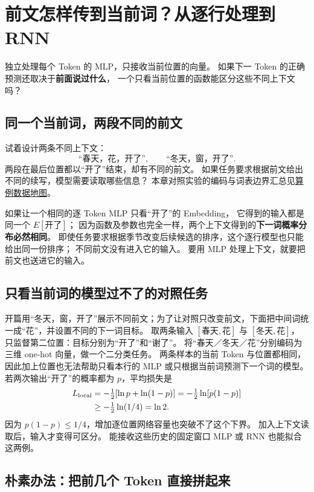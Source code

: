 \chapterrule
\section{前文怎样传到当前词？从逐行处理到 RNN}
\label{intro:context-gap}
\label{intro:context-and-rnn}

独立处理每个 Token 的 MLP，只接收当前位置的向量。
如果下一 Token 的正确预测还取决于\textbf{前面说过什么}，
一个只看当前位置的函数能区分这些不同上下文吗？

\subsection{同一个当前词，两段不同的前文}
\label{partq:context}

试着设计两条不同上下文：
\[
\text{“春天，花，开了”},\qquad
\text{“冬天，窗，开了”}.
\]
两段在最后位置都以“开了”结束，却有不同的前文。
如果任务要求根据前文给出不同的续写，模型需要读取哪些信息？
本章对照实验的编码与词表边界汇总见\hyperref[app:data-map]{算例数据地图}。

如果让一个相同的逐 Token MLP 只看“开了”的 Embedding，
它得到的输入都是同一个 $E[\text{开了}]$；
因为函数及参数也完全一样，两个上下文得到的\textbf{下一词概率分布必然相同}。
即使任务要求根据季节改变后续候选的排序，这个逐行模型也只能给出同一份排序；
不同前文没有进入它的输入。
要用 MLP 处理上下文，就要把前文也送进它的输入。

\subsection{只看当前词的模型过不了的对照任务}
\label{experiment:context-contrast}
开篇用“冬天，窗，开了”展示不同前文；为了让对照只改变前文，下面把中间词统一成“花”，并设置不同的下一词目标。
取两条输入 $[\text{春天},\text{花}]$ 与 $[\text{冬天},\text{花}]$，
只监督第二位置：目标分别为“开了”和“谢了”。
将“春天／冬天／花”分别编码为三维 one-hot 向量，做一个二分类任务。
两条样本的当前 Token 与位置都相同，
因此加上位置也无法帮助只看本行的 MLP 或只根据当前词预测下一个词的模型。
若两次输出“开了”的概率都为 $p$，平均损失是
\[
\begin{aligned}
L_{\rm local}&=-\tfrac12[\ln p+\ln(1-p)]
=-\tfrac12\ln[p(1-p)]\\
&\geq-\tfrac12\ln(1/4)=\ln2.
\end{aligned}
\]
因为 $p(1-p)\leq1/4$，增加逐位置网络容量也突破不了这个下界。
加入上下文读取后，输入才变得可区分。
能接收这些历史的固定窗口 MLP 或 RNN 也能拟合这两例。
\subsection{朴素办法：把前几个 Token 直接拼起来}

